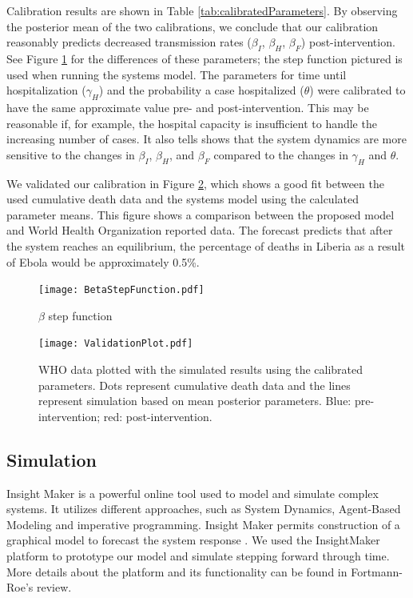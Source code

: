 Calibration results are shown in Table \ref{tab:calibratedParameters}. By observing the posterior mean of the two calibrations, we conclude that our calibration reasonably predicts decreased transmission rates ($\beta_I$, $\beta_H$, $\beta_F$) post-intervention. See Figure \ref{fig:BetaStepFunction} for the differences of these parameters; the step function pictured is used when running the systems model. The parameters for time until hospitalization ($\gamma_H$) and the probability a case hospitalized ($\theta$) were calibrated to have the same approximate value pre- and post-intervention. This may be reasonable if, for example, the hospital capacity is insufficient to handle the increasing number of cases. It also tells shows that the system dynamics are more sensitive to the changes in {$\beta_I$, $\beta_H$, and $\beta_F$} compared to the changes in {$\gamma_H$ and $\theta$}.


We validated our calibration in Figure \ref{fig:Cumulative _Death}, which shows a good fit between the used cumulative death data and the systems model using the calculated parameter means. This figure shows a comparison between the proposed model and World Health Organization reported data. The forecast predicts that after the system reaches an equilibrium, the percentage of deaths in Liberia as a result of Ebola would be approximately 0.5\%.




\begin{figure}[!h]
  \centering
  \texttt{[image: BetaStepFunction.pdf]}
  \caption{$\beta$ step function} 
\label{fig:BetaStepFunction} 
\end{figure}


\begin{figure}[h]
  \centering
  \texttt{[image: ValidationPlot.pdf]}
  \caption{WHO data plotted with the simulated results using the calibrated parameters. Dots represent cumulative death data and the lines represent simulation based on mean posterior parameters. Blue: pre-intervention; red: post-intervention.}
\label{fig:Cumulative _Death}
\end{figure}




\subsection{Simulation}
Insight Maker is a powerful online tool used to model and simulate complex systems. It utilizes different approaches, such as System Dynamics, Agent-Based Modeling and imperative programming. Insight Maker permits  construction of a graphical model to forecast the system response \cite{FortmannRoe}. We used the InsightMaker platform to prototype our model and simulate stepping forward through time. More details about the platform and its functionality can be found in Fortmann-Roe's review.

